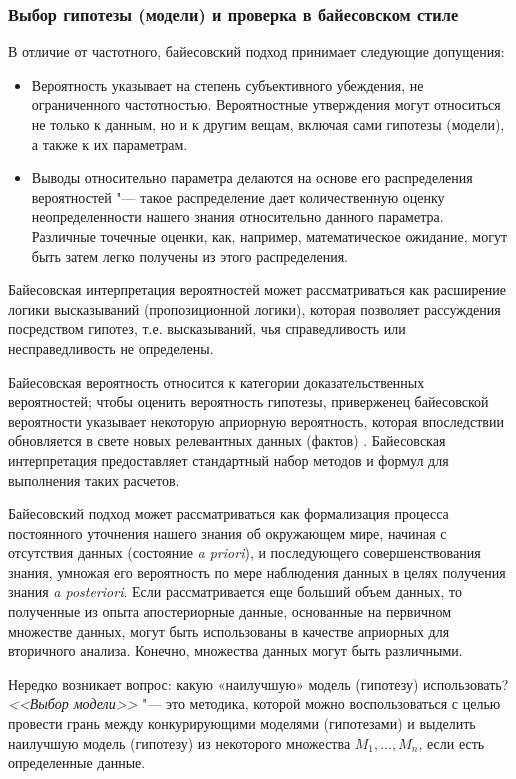 \subsubsection{Выбор гипотезы (модели) и проверка в байесовском стиле}\label{sect1_2_2_2}

В отличие от частотного, байесовский подход принимает следующие допущения:
\begin{itemize}
    \item Вероятность указывает на степень субъективного убеждения, не ограниченного частотностью. Вероятностные 
        утверждения могут относиться не только к данным, но и к другим вещам, включая сами гипотезы (модели), а также к 
        их параметрам.
    \item Выводы относительно параметра делаются на основе его распределения вероятностей "--- такое распределение 
        дает количественную оценку неопределенности нашего знания относительно данного параметра. Различные точечные 
        оценки, как, например, математическое ожидание, могут быть затем легко получены из этого распределения.
\end{itemize}

Байесовская интерпретация вероятностей может рассматриваться как расширение логики высказываний (пропозиционной 
логики), которая позволяет рассуждения посредством гипотез, т.е. высказываний, чья справедливость или несправедливость 
не определены.

Байесовская вероятность относится к категории доказательственных вероятностей; чтобы оценить вероятность гипотезы, 
приверженец байесовской вероятности указывает некоторую априорную вероятность, которая впоследствии обновляется в 
свете новых релевантных данных (фактов) \cite{sivia2006data}. Байесовская интерпретация предоставляет стандартный 
набор методов и формул для выполнения таких расчетов.

Байесовский подход может рассматриваться как формализация процесса постоянного уточнения нашего знания об окружающем 
мире, начиная с отсутствия данных (состояние \textit{a priori}), и последующего совершенствования знания, умножая 
его вероятность по мере наблюдения данных в целях получения знания \textit{a posteriori}. Если рассматривается еще 
больший объем данных, то полученные из опыта апостериорные данные, основанные на первичном множестве данных, могут 
быть использованы в качестве априорных для вторичного анализа. Конечно, множества данных могут быть различными.

Нередко возникает вопрос: какую «наилучшую» модель (гипотезу) использовать? \textit{<<Выбор модели>>} "--- это 
методика, которой можно воспользоваться с целью провести грань между конкурирующими моделями (гипотезами) и выделить 
наилучшую модель (гипотезу) из некоторого множества ${M_1,\ldots, M_n}$, если есть определенные данные.

